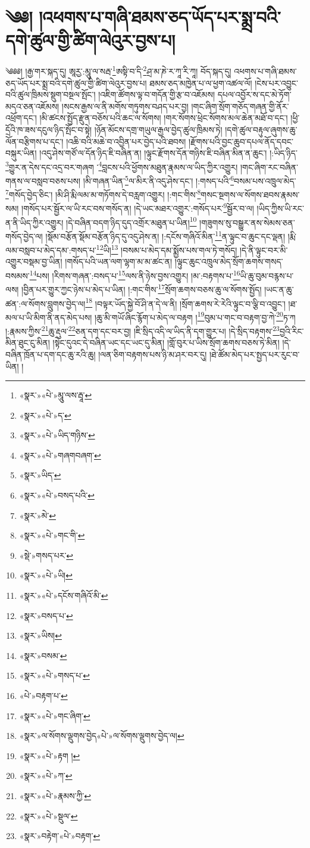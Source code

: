 \chapter{༄༅། །འཕགས་པ་གཞི་ཐམས་ཅད་ཡོད་པར་སྨྲ་བའི་དགེ་ཚུལ་གྱི་ཚིག་ལེའུར་བྱས་པ།}༄༅༅། །རྒྱ་གར་སྐད་དུ། ཨཱརྱ་:མཱུ་ལ་སརྦ་\footnote{«སྣར་»«པེ་»མཱུ་ལས་རྦཱ་}ཨསྟི་བ་དི་\footnote{«སྣར་»«པེ་»ད་}ཤྲ་མ་ཎེ་ར་ཀཱ་རི་ཀཱ། བོད་སྐད་དུ། འཕགས་པ་གཞི་ཐམས་ཅད་ཡོད་པར་སྨྲ་བའི་དགེ་ཚུལ་གྱི་ཚིག་ལེའུར་བྱས་པ། ཐམས་ཅད་མཁྱེན་པ་ལ་ཕྱག་འཚལ་ལོ། །ངེས་པར་འབྱུང་བའི་ཚུལ་ཁྲིམས་སྡུག་བསྔལ་སྤོང་། །འཇིག་ཚོགས་ལྟ་བ་གདོན་གྱི་རྩ་བ་འཇོམས། དཔལ་འབྱོར་ས་དང་མེ་ཏོག་མདའ་ཅན་འཇོམས། །སངས་རྒྱས་ལ་ནི་མགོས་གཏུགས་བཤད་པར་བྱ། །གང་ཞིག་སྲོག་གཅོད་གཞན་གྱི་ནོར་འཕྲོག་དང་། །མི་ཚངས་སྤྱོད་རྫུན་བཅོས་པའི་ཆང་ལ་སོགས། །གར་སོགས་ཕྲེང་སོགས་མལ་ཆེན་མཐོ་བ་དང་། །ཕྱི་དྲོའི་ཁ་ཟས་དངུལ་ཉིད་སྤོང་བ་སྟེ། །ཉོན་མོངས་དགྲ་གཡུལ་རྒྱལ་བྱེད་ཚུལ་ཁྲིམས་ཏེ། །དགེ་ཚུལ་བརྟུལ་ཞུགས་ཆུ་ལོན་བརྩིགས་པ་དང་། །འཆི་བའི་མཆེ་བ་འབྱིན་པར་བྱེད་པའི་ཐབས། །རྫོགས་པའི་བྱང་ཆུབ་དཔལ་ནོད་དབང་བསྐུར་ཡིན། །འདུ་ཤེས་གཙོ་ལ་དོན་ཉིད་ཇི་བཞིན་ན། །ལྟུང་རྫོགས་དོན་གཉིས་ཇི་བཞིན་མིན་ན་ཆུང་། །:ཡིད་ཉིད་\footnote{«སྣར་»«པེ་»ཡིད་གཉིས་}གྱུར་ན་དེས་དང་འདྲ་བར་གཞག ་\footnote{«སྣར་»«པེ་»གཞགབཞག་}བླངས་པའི་ཕྱོགས་མཐུན་རྣམས་ལ་ཡིད་ཀྱིར་འགྱུར། །གང་ཞིག་རང་བཞིན་གནས་ལ་བསླབ་བཅས་པས། །མི་གཞན་ཡིན་\footnote{«སྣར་»ཡིད་}ལ་མིར་ནི་འདུ་ཤེས་དང་། །:གསད་པའི་\footnote{«སྣར་»«པེ་»བསད་པའི་}བསམ་པས་འཁྲུལ་མེད་\footnote{«སྣར་»མེ་}གསོད་བྱེད་ཅིང་། །མི་ཤི་རྨི་ལམ་མ་གཏོགས་དེ་བརླག་འགྱུར། །:གང་གིས་\footnote{«སྣར་»«པེ་»གང་གི་}གསང་སྔགས་ལ་སོགས་ཐབས་རྣམས་སམ། །གསོད་པར་སྦྱོར་ལ་ཡི་རང་བས་གསོད་ན། །དེ་ཡང་མཐར་འགྱུར་:གསོད་པར་\footnote{«སྡེ་»གསད་པར་}སྦྱོར་བ་ལ། །ཡིད་ཀྱིས་ཡི་རང་ན་ནི་ཡིད་ཀྱིར་འགྱུར། །དེ་བཞིན་བདག་ཉིད་དུད་འགྲོར་མཐུན་པ་ཡིན།\footnote{«སྣར་»«པེ་»ཡི།} །གཟུགས་སུ་བསྒྱུར་ནས་སེམས་ཅན་གསོད་བྱེད་ལ། །སྡོམ་བརྩོན་སྡོམ་བརྩོན་ཉིད་དུ་འདུ་ཤེས་ན། །:དངོས་གཞིའོ་མིན་\footnote{«སྣར་»«པེ་»དངོས་གཞིའོ་མི་}ན་ལྟུང་བ་ཆུང་དང་ལྡན། །རྨི་ལམ་བསླབ་པ་མེད་དམ་:གསད་པ་\footnote{«སྣར་»བསད་པ་}ཡི།\footnote{«སྣར་»ཡིས།} །བསམ་པ་མེད་དམ་སྨྱོས་པས་གལ་ཏེ་གསོད། །དེ་ནི་ལྟུང་བར་མི་འགྱུར་བསྡམ་བྱ་ཡིན། །གསོད་པའི་ཡན་ལག་ལྷག་མ་མ་ཚང་ན། །ལྟུང་ཆུང་འཁྲུལ་མེད་སྲོག་ཆགས་གསད་བསམས་\footnote{«སྣར་»བསམ་}པས། །རིགས་གཞན་:བསད་པ་\footnote{«སྣར་»«པེ་»གསད་པ་}ལས་ནི་ཉེས་བྱས་འགྱུར། །མ་:བརྟགས་པ་\footnote{«པེ་»བརྟག་པ་}ཡི་ཆུ་བུམ་བརྙས་པ་ལས། །བྱིན་པར་གྱུར་ཀྱང་ཉེས་པ་མེད་པ་ཡིན། །:གང་གིས་\footnote{«སྣར་»«པེ་»གང་ཞིག་}སྲོག་ཆགས་བཅས་ཆུ་ལ་སོགས་སྤྱོད། །ཡང་ན་ཆུ་ཚན་:ལ་སོགས་བླུགས་བྱེད་ལ།\footnote{«སྣར་»ལ་སོགས་ལྡུགས་བྱེད«པེ་»ལ་སོགས་ལྡུགས་བྱེད་ལ།} །བལྟར་ཡོད་སྐྱེ་བོ་ཤི་ན་དེ་ལ་ནི། །སྲོག་ཆགས་རེ་རེའི་ལྟུང་བ་ལྕི་བ་འབྱུང་། །ཐ་མལ་པ་ཡི་མིག་ནི་ནད་མེད་པས། །ཆུ་མི་གཡོ་ཞིང་རྙོག་པ་མེད་ལ་བརྟག །\footnote{«སྣར་»«པེ་»རྟག །}བུམ་པ་གང་བ་བརྟག་བྱ་ཀེ་\footnote{«སྣར་»«པེ་»ཀ་}ཏ་ཀ །:རྣམས་ཀྱིས་\footnote{«སྣར་»«པེ་»རྣམས་ཀྱི་}ཆུ་རྡུལ་\footnote{«སྣར་»«པེ་»སྡུལ་}ཅན་དག་དང་བར་བྱ། །ཇི་སྲིད་འདི་ལ་ཡིད་ནི་དག་གྱུར་པ། །དེ་སྲིད་བརྟགས་\footnote{«སྣར་»བརྟེག་«པེ་»བརྟག་}བྱའི་རིང་མིན་ཐུང་ངུ་མིན། །སྟེང་དུའང་དེ་བཞིན་ཡང་དང་ཡང་དུ་མིན། །གློ་བུར་པ་ཡིས་སྲོག་ཆགས་བཅས་ཏེ་མིན། །དེ་བཞིན་ཁྲོན་པ་དག་དང་ཆུ་རའི་ཆུ། །ལན་ཅིག་བརྟགས་པས་ཉི་མ་ཤར་བར་དུ། །ཐེ་ཚོམ་མེད་པར་སྤྱད་པར་རུང་བ་ཡིན། །
